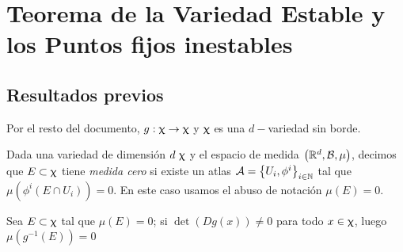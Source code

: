 \chapter{Teorema de la Variedad Estable y los Puntos fijos inestables}\label{ch:teorema-de-variedad-estable}
\section{Resultados previos}


Por el resto del documento, $g: \upchi \rightarrow \upchi$ y $\upchi$ es una $d-$variedad sin borde.

\begin{definition}
	Dada una variedad de dimensi\'on $d \ \mani$ y el espacio de medida $\left({\mathbb{R}}^d, \mathcal{B}, \mu\right)$, decimos que $E \subset \upchi$ tiene \textit{medida cero} si existe un atlas $\mathcal{A} = \left\lbrace U_i, \phi^i\right\rbrace_{i \in {\mathbb{N}}}$ tal que $\mu \left(\phi^i \left(E \cap U_i \right) \right) = 0$. En este caso usamos el abuso de notaci\'on $\mu(E) = 0$.
\end{definition}

\begin{lemma}
	\label{Difeomorfismos locales preservan medida cero}
	Sea $E \subset \upchi$ tal que $\mu(E) = 0$; si $\det \left(Dg(x)\right) \neq 0$ para todo $x \in \upchi$, luego $\mu\left(g^{-1}(E)\right) = 0$
\end{lemma}

